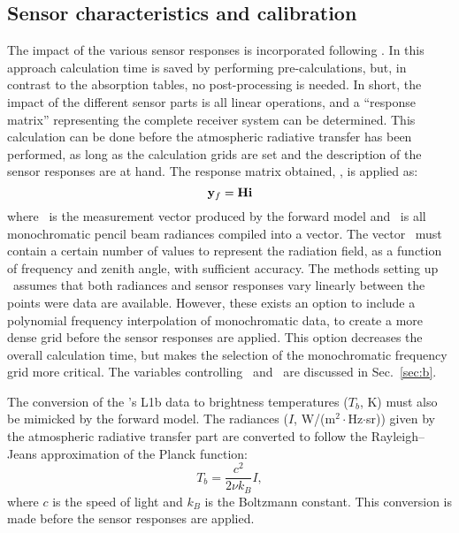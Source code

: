 \subsection{Sensor characteristics and calibration}
%
The impact of the various sensor responses is incorporated following
\citet{eriksson:06}. In this approach calculation time is saved by
performing pre-calculations, but, in contrast to the absorption tables, no
post-processing is needed. In short, the impact of the different sensor parts
is all linear operations, and a ``response matrix'' representing the complete
receiver system can be determined. This calculation can be done before the
atmospheric radiative transfer has been performed, as long as the calculation
grids are set and the description of the sensor responses are at hand. The
response matrix obtained, \SnsMtr, is applied as:
\begin{equation}
  \label{eq:H}
  \mathbf{y}_{f} = \mathbf{H}\mathbf{i}
\end{equation}
where \ is the measurement vector produced by the forward model and
\MpiVct\ is all monochromatic pencil beam radiances compiled into a vector. The
vector \MpiVct\ must contain a certain number of values to represent the
radiation field, as a function of frequency and zenith angle, with sufficient
accuracy. The methods setting up \SnsMtr\ assumes that both radiances and
sensor responses vary linearly between the points were data are available.
However, these exists an option to include a polynomial frequency interpolation
of monochromatic data, to create a more dense grid before the sensor responses
are applied. This option decreases the overall calculation time, but makes the
selection of the monochromatic frequency grid more critical. The variables
controlling \SnsMtr\ and \MpiVct\ are discussed in Sec.~\ref{sec:b}.

The conversion of the \smr's L1b data to brightness temperatures ($T_b$, K)
must also be mimicked by the forward model. The radiances ($I$,
W/(m$^2\cdot$Hz$\cdot$sr)) given by the atmospheric radiative transfer part are
converted to follow the Rayleigh--Jeans approximation of the Planck function:
\begin{equation}
  \label{eq:i2tb}
  T_b = \frac{c^2}{2\nu k_B} I,
\end{equation}
where $c$ is the speed of light and $k_B$ is the Boltzmann constant. This
conversion is made before the sensor responses are applied.



